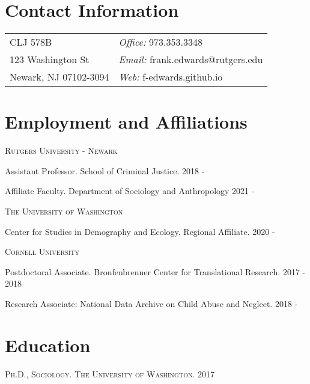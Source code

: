 \documentclass[margin,line]{res}
\newenvironment{list1}{
  \begin{list}{\ding{113}}{%
      \setlength{\itemsep}{0in}
      \setlength{\parsep}{0in} \setlength{\parskip}{0in}
      \setlength{\topsep}{0in} \setlength{\partopsep}{0in}
      \setlength{\leftmargin}{0.17in}}}{\end{list}}
\begin{document}

\begin{resume}
\section{\sc Contact Information}
\vspace{.05in}
\begin{tabular}{@{}p{2in}p{4in}}

CLJ 578B   & {\it Office:}  973.353.3348 \\
123 Washington St & {\it Email:} frank.edwards@rutgers.edu\\
Newark, NJ 07102-3094 &  {\it Web:} f-edwards.github.io\\
\end{tabular}

\section{\sc Employment and Affiliations}

\textsc{Rutgers University - Newark}
\begin{list1}
\item[] Assistant Professor. School of Criminal Justice. 2018 - 
\item[] Affiliate Faculty. Department of Sociology and Anthropology 2021 - 
\end{list1}

\textsc{The University of Washington}
\begin{list1}
\item[] Center for Studies in Demography and Ecology. Regional Affiliate. 2020 - 
\end{list1}

\textsc{Cornell University}
\begin{list1}
\item[] Postdoctoral Associate. Bronfenbrenner Center for Translational Research. 2017 - 2018
\item[] Research Associate: National Data Archive on Child Abuse and Neglect. 2018 - 
\end{list1}

\section{\sc Education}
\textsc{Ph.D., Sociology. The University of Washington. 2017}


\end{resume}
\end{document}
